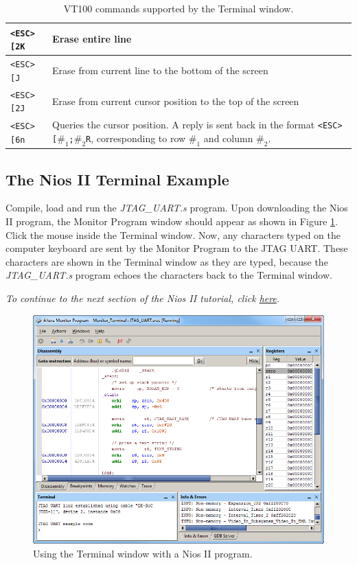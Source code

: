 \documentclass[11pt, twoside, pdftex]{article}
\begin{document}
\begin{table}[H]
\begin{tabular}{|l|p{4in}|}
        \hline
        \texttt{<ESC>[2K}&Erase entire line\\
        \hline
        \texttt{<ESC>[J}&Erase from current line to the bottom of the screen\\
        \hline
        \texttt{<ESC>[2J}&Erase from current cursor position to the top of the screen\\
        \hline
        \texttt{<ESC>[6n}&Queries the cursor position. A reply is sent back in the format \texttt{<ESC>[\emph{$\#_1$};\emph{$\#_2$}R},
            corresponding to row \emph{$\#_1$} and column \emph{$\#_2$}.\\
        \hline
    \end{tabular}
    \caption{VT100 commands supported by the Terminal window.} 

\end{table}

\newpage
\subsection{The Nios II Terminal Example}
\label{tut:nios_6}

Compile, load and run the {\it JTAG\_UART.s} program.
Upon downloading the Nios II program, the Monitor Program
window should appear as shown in Figure \ref{fig:AMP_terminal_nios}. 
Click the mouse inside the Terminal window. Now, any characters
typed on the computer keyboard are sent by the Monitor Program to
the JTAG UART. These characters are shown in the Terminal window
as they are typed, because the {\it JTAG\_UART.s} program echoes
the characters back to the Terminal window.

{\it To continue to the next section of the Nios II tutorial, click \hyperref[tut:nios_7]{here}.}

\begin{figure}[H]
   \begin{center}
      \includegraphics[scale=0.6]{screenshots/figure45.png}
   \end{center}
   \caption{Using the Terminal window with a Nios II program.}
   \label{fig:AMP_terminal_nios}
\end{figure}
\end{document}
